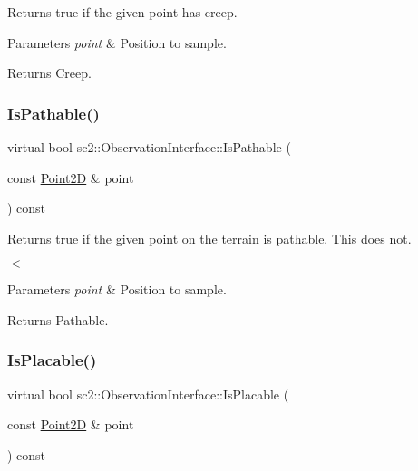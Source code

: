 Returns \textquotesingle{}true\textquotesingle{} if the given point has creep. 
\begin{DoxyParams}{Parameters}
{\em point} & Position to sample. \\
\hline
\end{DoxyParams}
\begin{DoxyReturn}{Returns}
Creep. 
\end{DoxyReturn}
\mbox{\label{classsc2_1_1_observation_interface_a09ba9ccd3b9c32a6e57d80da3e739a49}} 
\subsubsection{\texorpdfstring{Is\+Pathable()}{IsPathable()}}
{\footnotesize\ttfamily virtual bool sc2\+::\+Observation\+Interface\+::\+Is\+Pathable (\begin{DoxyParamCaption}\item[{const \hyperlink{structsc2_1_1_point2_d}{Point2D} \&}]{point }\end{DoxyParamCaption}) const\hspace{0.3cm}{\ttfamily [pure virtual]}}



Returns \textquotesingle{}true\textquotesingle{} if the given point on the terrain is pathable. This does not. 

$<$ 
\begin{DoxyParams}{Parameters}
{\em point} & Position to sample. \\
\hline
\end{DoxyParams}
\begin{DoxyReturn}{Returns}
Pathable. 
\end{DoxyReturn}
\mbox{\label{classsc2_1_1_observation_interface_aceb3be53ab7a68e268169e6f786e61f6}} 
\subsubsection{\texorpdfstring{Is\+Placable()}{IsPlacable()}}
{\footnotesize\ttfamily virtual bool sc2\+::\+Observation\+Interface\+::\+Is\+Placable (\begin{DoxyParamCaption}\item[{const \hyperlink{structsc2_1_1_point2_d}{Point2D} \&}]{point }\end{DoxyParamCaption}) const\hspace{0.3cm}{\ttfamily [pure virtual]}}



